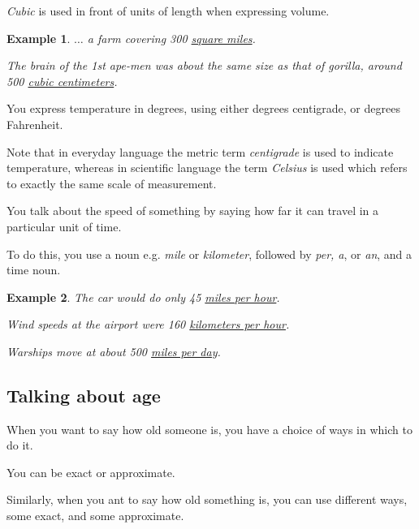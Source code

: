 \documentclass[oneside]{book}
\numberwithin{equation}{section}
\newtheorem{example}{Example}[section]
\begin{document}
\textit{Cubic} is used in front of units of length when expressing volume.
\begin{example}
    $\ldots$ a farm covering 300 \underline{square miles}.
    
    The brain of the 1st ape-men was about the same size as that of gorilla, around 500 \underline{cubic centimeters}.
\end{example}
You express temperature in degrees, using either degrees centigrade, or degrees Fahrenheit.

Note that in everyday language the metric term \textit{centigrade} is used to indicate temperature, whereas in scientific language the term \textit{Celsius} is used which refers to exactly the same scale of measurement.

%
\noindent{} You talk about the speed of something by saying how far it can travel in a particular unit of time.

To do this, you use a noun e.g. \textit{mile} or \textit{kilometer}, followed by \textit{per, a}, or \textit{an}, and a time noun.
\begin{example}
    The car would do only 45 \underline{miles per hour}.
    
    Wind speeds at the airport were 160 \underline{kilometers per hour}.
    
    Warships move at about 500 \underline{miles per day}.
\end{example}

\subsection{Talking about age}
\noindent{} When you want to say how old someone is, you have a choice of ways in which to do it.

You can be exact or approximate.

Similarly, when you ant to say how old something is, you can use different ways, some exact, and some approximate.
\end{document}
